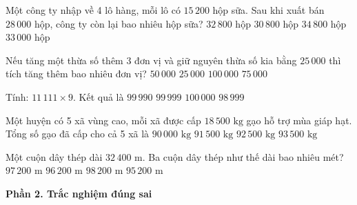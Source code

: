 \begin{ex} %
Một công ty nhập về 4 lô hàng, mỗi lô có $15\,200$ hộp sữa. Sau khi xuất bán $28\,000$ hộp, công ty còn lại bao nhiêu hộp sữa?
\choice
{\True $32\,800$ hộp}
{$30\,800$ hộp}
{$34\,800$ hộp}
{$33\,000$ hộp}
\end{ex}

\begin{ex} %
Nếu tăng một thừa số thêm 3 đơn vị và giữ nguyên thừa số kia bằng $25\,000$ thì tích tăng thêm bao nhiêu đơn vị?
\choice
{$50\,000$}
{$25\,000$}
{$100\,000$}
{\True $75\,000$}
\end{ex}

\begin{ex} %
Tính: $11\,111 \times 9$. Kết quả là
\choice
{$99\,990$}
{\True $99\,999$}
{$100\,000$}
{$98\,999$}
\end{ex}

\begin{ex} %
Một huyện có 5 xã vùng cao, mỗi xã được cấp $18\,500\text{ kg}$ gạo hỗ trợ mùa giáp hạt. Tổng số gạo đã cấp cho cả 5 xã là
\choice
{$90\,000\text{ kg}$}
{$91\,500\text{ kg}$}
{\True $92\,500\text{ kg}$}
{$93\,500\text{ kg}$}
\end{ex}

\begin{ex} %
Một cuộn dây thép dài $32\,400\text{ m}$. Ba cuộn dây thép như thế dài bao nhiêu mét?
\choice
{\True $97\,200\text{ m}$}
{$96\,200\text{ m}$}
{$98\,200\text{ m}$}
{$95\,200\text{ m}$}
\end{ex}

\textbf{Phần 2. Trắc nghiệm đúng sai}


